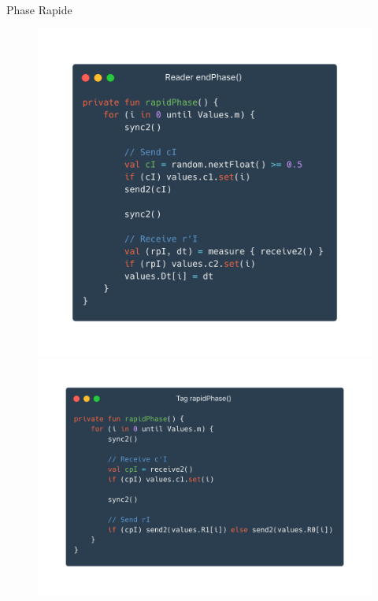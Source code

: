 \documentclass[aspectratio=169]{beamer}
\begin{document}
\begin{frame}{Phase Rapide}
  \begin{figure}[!htb]
    \centering

    \begin{minipage}{.45\textwidth}
      \centering
      \includegraphics[width=\linewidth]{../assets/reader2}
    \end{minipage}%
    \begin{minipage}{.55\textwidth}
      \centering
      \includegraphics[width=\linewidth]{../assets/tag2}
    \end{minipage}

  \end{figure}
\end{frame}
\end{document}
